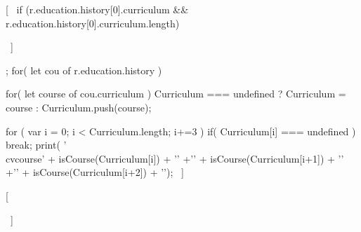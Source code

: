 [~ if (r.education.history[0].curriculum && r.education.history[0].curriculum.length) 
{ ~]

\begin{cvcourses}
 [~ 
    function isCourse(cou){
      if( cou === undefined || cou === null ){
        return '';
      }
      else{
        return cou;
      }
    }
    var Curriculum=[];
    for( let cou of r.education.history ) { 
      for( let course of cou.curriculum ) {
        Curriculum === undefined ? Curriculum = course : Curriculum.push(course);
      }
   
  } 
  for ( var i = 0; i < Curriculum.length; i+=3 ){ 
    if( Curriculum[i] === undefined )
    {break;}
    print( '\\cvcourse{' + isCourse(Curriculum[i]) + '}'
    +'{' + isCourse(Curriculum[i+1]) + '}'
    +'{' + isCourse(Curriculum[i+2]) + '}\n\n');
  } 
~]
\end{cvcourses}

[~ } ~]
